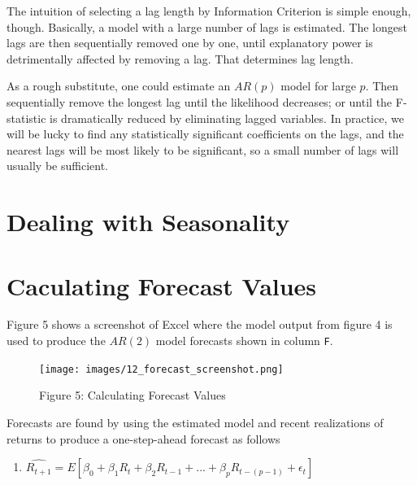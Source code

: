 \documentclass[
  letterpaper,
  DIV=11,
  numbers=noendperiod]{scrreprt}
\providecommand{\tightlist}{%
  \setlength{\itemsep}{0pt}\setlength{\parskip}{0pt}}\usepackage{longtable,booktabs,array}
\begin{document}
The intuition of selecting a lag length by Information Criterion is
simple enough, though. Basically, a model with a large number of lags is
estimated. The longest lags are then sequentially removed one by one,
until explanatory power is detrimentally affected by removing a lag.
That determines lag length.

As a rough substitute, one could estimate an \(AR(p)\) model for large
\(p\). Then sequentially remove the longest lag until the likelihood
decreases; or until the F-statistic is dramatically reduced by
eliminating lagged variables. In practice, we will be lucky to find any
statistically significant coefficients on the lags, and the nearest lags
will be most likely to be significant, so a small number of lags will
usually be sufficient.

\hypertarget{dealing-with-seasonality}{%
\section{Dealing with Seasonality}\label{dealing-with-seasonality}}

\hypertarget{caculating-forecast-values}{%
\section{Caculating Forecast Values}\label{caculating-forecast-values}}

Figure 5 shows a screenshot of Excel where the model output from figure
4 is used to produce the \(AR(2)\) model forecasts shown in column
\texttt{F}.

\begin{figure}

{\centering \texttt{[image: images/12\_forecast\_screenshot.png]}

}

\caption{Figure 5: Calculating Forecast Values}

\end{figure}

Forecasts are found by using the estimated model and recent realizations
of returns to produce a one-step-ahead forecast as follows

\begin{enumerate}
\def\labelenumi{\arabic{enumi}.}
\setcounter{enumi}{2}
\tightlist
\item
  \(\hat{R_{t+1}} = E[\beta_0 + \beta_1R_{t} + \beta_2R_{t-1}+ ... + \beta_{p}R_{t-(p-1)} + \epsilon_t]\)
\end{enumerate}
\end{document}
